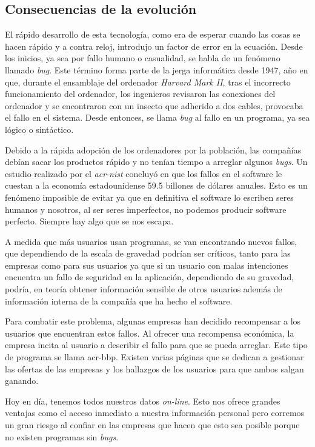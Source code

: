 \documentclass[twoside, titlepage, 12pt, a4paper]{article}
\begin{document}
\subsection{Consecuencias de la evolución}
El rápido desarrollo de esta tecnología, como era de esperar cuando las cosas se hacen rápido y a contra reloj, introdujo un factor de error en la ecuación. Desde los inicios, ya sea por fallo humano o casualidad, se habla de un fenómeno llamado \textit{\gls{bug}}. Este término forma parte de la jerga informática desde 1947, año en que, durante el ensamblaje del ordenador \textit{Harvard Mark II}, tras el incorrecto funcionamiento del ordenador, los ingenieros revisaron las conexiones del ordenador y se encontraron con un insecto que adherido a dos cables, provocaba el fallo en el sistema. Desde entonces, se llama \textit{\gls{bug}} al fallo en un programa, ya sea lógico o sintáctico.\par
Debido a la rápida adopción de los ordenadores por la población, las compañías debían sacar los productos rápido y no tenían tiempo a arreglar algunos \textit{\gls{bug}s}. Un estudio realizado por el \textit{\gls{acr-nist}} concluyó en que los fallos en el software le cuestan a la economía estadounidense 59.5 billones de dólares anuales.\cite{NIST} Esto es un fenómeno imposible de evitar ya que en definitiva el software lo escriben seres humanos y nosotros, al ser seres imperfectos, no podemos producir software perfecto. Siempre hay algo que se nos escapa.\par
A medida que más usuarios usan programas, se van encontrando nuevos fallos, que dependiendo de la escala de gravedad podrían ser críticos, tanto para las empresas como para sus usuarios ya que si un usuario con malas intenciones encuentra un fallo de seguridad en la aplicación, dependiendo de su gravedad, podría, en teoría obtener información sensible de otros usuarios además de información interna de la compañía que ha hecho el software.\par
Para combatir este problema, algunas empresas han decidido recompensar a los usuarios que encuentran estos fallos. Al ofrecer una recompensa económica, la empresa incita al usuario a describir el fallo para que se pueda arreglar. Este tipo de programa se llama \gls{acr-bbp}. Existen varias páginas que se dedican a gestionar las ofertas de las empresas y los hallazgos de los usuarios para que ambos salgan ganando.\par
Hoy en día, tenemos todos nuestros datos \textit{on-line}. Esto nos ofrece grandes ventajas como el acceso inmediato a nuestra información personal pero corremos un gran riesgo al confiar en las empresas que hacen que esto sea posible porque no existen programas sin  \textit{\gls{bug}s}.
\end{document}
